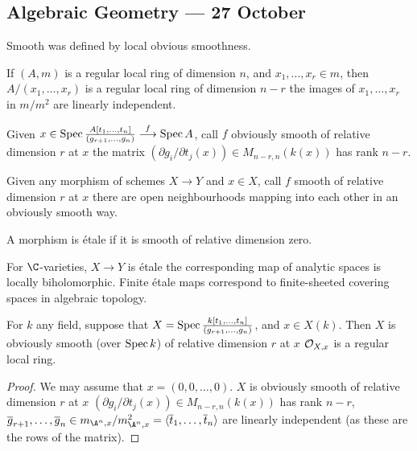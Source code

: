 \documentclass[11pt]{article}
\begin{document}
\begin{Oct27}
\section*{Algebraic Geometry --- 27 October}
Smooth was defined by local obvious smoothness.
\begin{fact*}
If $(A,m)$ is a regular local ring of dimension $n$, and $x_1,\ldots, x_r\in m$, then $A/(x_1,\ldots,x_r)$ is a regular local ring of dimension $n-r$ \Iff the images of $x_1,\ldots,x_r$ in $m/m^2$ are linearly independent.
\end{fact*}
\begin{defn*}
Given $x\in\operatorname{Spec}\frac{ A[t_1,\ldots,t_n]}{(g_{r+1},\ldots,g_n)}\overset{f}{\longrightarrow} \operatorname{Spec} A$, call $f$ obviously smooth of relative dimension $r$ at $x$ \Iff the matrix $(\partial g_i/\partial t_j(x))\in M_{n-r,n}(k(x))$ has rank $n-r$.
\end{defn*}
\begin{defn*}
Given any morphism of schemes $X\to Y$ and $x\in X$, call $f$ smooth of relative dimension $r$ at $x$ \Iff there are open neighbourhoods mapping into  each other in an obviously smooth way.
\end{defn*}
\begin{defn*}
A morphism is \'etale if it is smooth of relative dimension zero.
\end{defn*}
\noindent For $\C$-varieties, $X\to Y$ is \'etale \Iff the corresponding map of analytic spaces is locally biholomorphic. Finite \'etale maps correspond to finite-sheeted covering spaces in algebraic topology.

\begin{prop*}
For $k$ any field, suppose that $X=\operatorname{Spec} \frac{k[t_1,\ldots,t_n]}{(g_{r+1},\ldots,g_n)}$, and $x\in X(k)$. Then $X$ is obviously smooth (over $\operatorname{Spec} k$) of relative dimension $r$ at $x$ \Iff $\mathcal{O}_{X,x}$ is a regular local ring.
\end{prop*}
\begin{proof}
We may assume that $x=(0,0,\ldots,0)$. $X$ is obviously smooth of relative dimension $r$ at $x$ \Iff $(\partial g_i/\partial t_j(x))\in M_{n-r,n}(k(x))$ has rank $n-r$, \Iff $\overline g_{r+1},\ldots,\overline g_n\in m_{\A^n,x}/m_{\A^n,x}^2=\langle \overline t_1,\ldots,\overline t_n\rangle $ are linearly independent (as these are the rows of the matrix).


\end{proof}
\end{Oct27}
\end{document}
